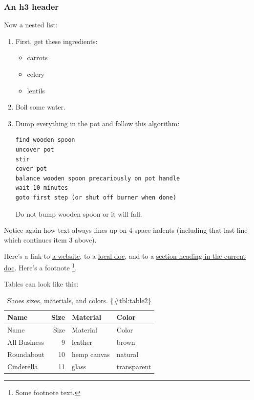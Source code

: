 \documentclass[
]{tufte-pandoc}
\providecommand{\tightlist}{%
  \setlength{\itemsep}{0pt}\setlength{\parskip}{0pt}}
\begin{document}
\hypertarget{an-h3-header}{%
\subsubsection{An h3 header}\label{an-h3-header}}

Now a nested list:

\begin{enumerate}
\def\labelenumi{\arabic{enumi}.}
\item
  First, get these ingredients:

  \begin{itemize}
  \tightlist
  \item
    carrots
  \item
    celery
  \item
    lentils
  \end{itemize}
\item
  Boil some water.
\item
  Dump everything in the pot and follow this algorithm:

\begin{verbatim}
find wooden spoon
uncover pot
stir
cover pot
balance wooden spoon precariously on pot handle
wait 10 minutes
goto first step (or shut off burner when done)
\end{verbatim}

  Do not bump wooden spoon or it will fall.
\end{enumerate}

Notice again how text always lines up on 4-space indents (including that
last line which continues item 3 above).

Here's a link to \href{http://foo.bar}{a website}, to a
\href{local-doc.html}{local doc}, and to a
\protect\hyperlink{an-h2-header}{section heading in the current doc}.
Here's a footnote \footnote{Some footnote text.}.

Tables can look like this:

\begin{longtable}[]{@{}lrll@{}}
\caption{Shoes sizes, materials, and colors.
\{\#tbl:table2\}}\tabularnewline
\toprule()
Name & Size & Material & Color \\
\midrule()
\endfirsthead
\toprule()
Name & Size & Material & Color \\
\midrule()
\endhead
All Business & 9 & leather & brown \\
Roundabout & 10 & hemp canvas & natural \\
Cinderella & 11 & glass & transparent \\
\bottomrule()
\end{longtable}
\end{document}

